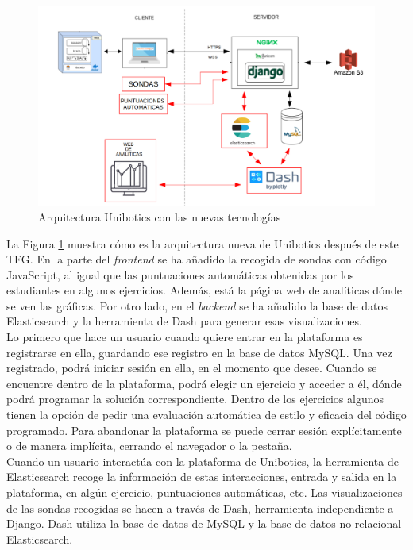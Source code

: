 \begin{figure}[H]
    \centering
    \includegraphics[width=14cm, keepaspectratio]{img/grafico2.png}
    \caption{Arquitectura Unibotics con las nuevas tecnologías}
    \label{fig:grafico2}
\end{figure}
La Figura \ref{fig:grafico2} muestra cómo es la arquitectura nueva de Unibotics después de este TFG. En la parte del \textit{frontend} se ha añadido la recogida de sondas con código JavaScript, al igual que las puntuaciones automáticas obtenidas por los estudiantes en algunos ejercicios. Además, está la página web de analíticas dónde se ven las gráficas. Por otro lado, en el \textit{backend} se ha añadido la base de datos Elasticsearch y la herramienta de Dash para generar esas visualizaciones.\\

Lo primero que hace un usuario cuando quiere entrar en la plataforma es registrarse en ella, guardando ese registro en la base de datos MySQL. Una vez registrado, podrá iniciar sesión en ella, en el momento que desee. Cuando se encuentre dentro de la plataforma, podrá elegir un ejercicio y acceder a él, dónde podrá programar la solución correspondiente. Dentro de los ejercicios algunos tienen la opción de pedir una evaluación automática de estilo y eficacia del código programado. Para abandonar la plataforma se puede cerrar sesión explícitamente o de manera implícita, cerrando el navegador o la pestaña.\\

Cuando un usuario interactúa con la plataforma de Unibotics, la herramienta de Elasticsearch recoge la información de estas interacciones, entrada y salida en la plataforma, en algún ejercicio, puntuaciones automáticas, etc. Las visualizaciones de las sondas recogidas se hacen a través de Dash, herramienta independiente a Django. Dash utiliza la base de datos de MySQL y la base de datos no relacional Elasticsearch.
